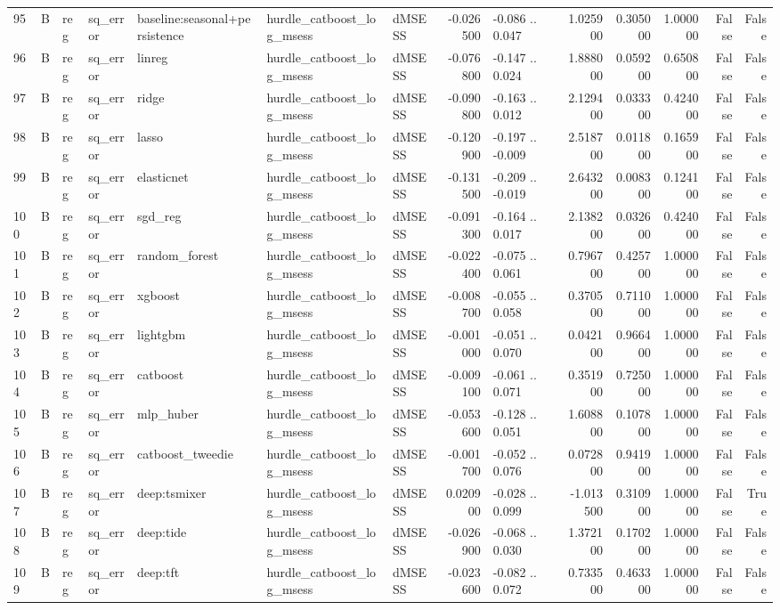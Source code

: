 \begin{table}
\begin{tabular}{lllllllrlrrrrr}
95 & B & reg & sq\_error & baseline:seasonal+persistence & hurdle\_catboost\_log\_msess & dMSESS & -0.026500 & -0.086 .. 0.047 & 1.025900 & 0.305000 & 1.000000 & False & False \\
96 & B & reg & sq\_error & linreg & hurdle\_catboost\_log\_msess & dMSESS & -0.076800 & -0.147 .. 0.024 & 1.888000 & 0.059200 & 0.650800 & False & False \\
97 & B & reg & sq\_error & ridge & hurdle\_catboost\_log\_msess & dMSESS & -0.090800 & -0.163 .. 0.012 & 2.129400 & 0.033300 & 0.424000 & False & False \\
98 & B & reg & sq\_error & lasso & hurdle\_catboost\_log\_msess & dMSESS & -0.120900 & -0.197 .. -0.009 & 2.518700 & 0.011800 & 0.165900 & False & False \\
99 & B & reg & sq\_error & elasticnet & hurdle\_catboost\_log\_msess & dMSESS & -0.131500 & -0.209 .. -0.019 & 2.643200 & 0.008300 & 0.124100 & False & False \\
100 & B & reg & sq\_error & sgd\_reg & hurdle\_catboost\_log\_msess & dMSESS & -0.091300 & -0.164 .. 0.017 & 2.138200 & 0.032600 & 0.424000 & False & False \\
101 & B & reg & sq\_error & random\_forest & hurdle\_catboost\_log\_msess & dMSESS & -0.022400 & -0.075 .. 0.061 & 0.796700 & 0.425700 & 1.000000 & False & False \\
102 & B & reg & sq\_error & xgboost & hurdle\_catboost\_log\_msess & dMSESS & -0.008700 & -0.055 .. 0.058 & 0.370500 & 0.711000 & 1.000000 & False & False \\
103 & B & reg & sq\_error & lightgbm & hurdle\_catboost\_log\_msess & dMSESS & -0.001000 & -0.051 .. 0.070 & 0.042100 & 0.966400 & 1.000000 & False & False \\
104 & B & reg & sq\_error & catboost & hurdle\_catboost\_log\_msess & dMSESS & -0.009100 & -0.061 .. 0.071 & 0.351900 & 0.725000 & 1.000000 & False & False \\
105 & B & reg & sq\_error & mlp\_huber & hurdle\_catboost\_log\_msess & dMSESS & -0.053600 & -0.128 .. 0.051 & 1.608800 & 0.107800 & 1.000000 & False & False \\
106 & B & reg & sq\_error & catboost\_tweedie & hurdle\_catboost\_log\_msess & dMSESS & -0.001700 & -0.052 .. 0.076 & 0.072800 & 0.941900 & 1.000000 & False & False \\
107 & B & reg & sq\_error & deep:tsmixer & hurdle\_catboost\_log\_msess & dMSESS & 0.020900 & -0.028 .. 0.099 & -1.013500 & 0.310900 & 1.000000 & False & True \\
108 & B & reg & sq\_error & deep:tide & hurdle\_catboost\_log\_msess & dMSESS & -0.026900 & -0.068 .. 0.030 & 1.372100 & 0.170200 & 1.000000 & False & False \\
109 & B & reg & sq\_error & deep:tft & hurdle\_catboost\_log\_msess & dMSESS & -0.023600 & -0.082 .. 0.072 & 0.733500 & 0.463300 & 1.000000 & False & False \\
\bottomrule
\end{tabular}
\end{table}

